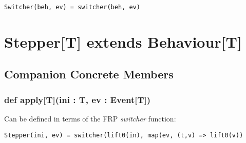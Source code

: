 \begin{verbatim}
Switcher(beh, ev) = switcher(beh, ev)
\end{verbatim}   

  \section*{Stepper[T] extends Behaviour[T]}
    \subsection*{Companion Concrete Members}
      \subsubsection*{def apply[T](ini : T, ev : Event[T])}
        Can be defined in terms of the FRP \emph{switcher} function:

\begin{verbatim}
Stepper(ini, ev) = switcher(lift0(in), map(ev, (t,v) => lift0(v))
\end{verbatim}